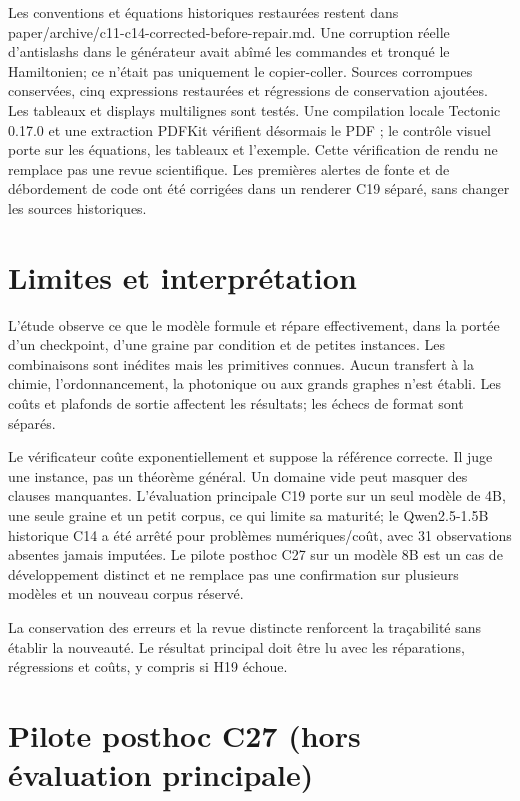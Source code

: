 \documentclass[11pt]{article}
\begin{document}
Les conventions et équations historiques restaurées restent dans paper/archive/c11-c14-corrected-before-repair.md. Une corruption réelle d'antislashs dans le générateur avait abîmé les commandes et tronqué le Hamiltonien; ce n'était pas uniquement le copier-coller. Sources corrompues conservées, cinq expressions restaurées et régressions de conservation ajoutées. Les tableaux et displays multilignes sont testés. Une compilation locale Tectonic 0.17.0 et une extraction PDFKit vérifient désormais le PDF ; le contrôle visuel porte sur les équations, les tableaux et l’exemple. Cette vérification de rendu ne remplace pas une revue scientifique. Les premières alertes de fonte et de débordement de code ont été corrigées dans un renderer C19 séparé, sans changer les sources historiques.

\section{Limites et interprétation}

L'étude observe ce que le modèle formule et répare effectivement, dans la portée d'un checkpoint, d'une graine par condition et de petites instances. Les combinaisons sont inédites mais les primitives connues. Aucun transfert à la chimie, l'ordonnancement, la photonique ou aux grands graphes n'est établi. Les coûts et plafonds de sortie affectent les résultats; les échecs de format sont séparés.

Le vérificateur coûte exponentiellement et suppose la référence correcte. Il juge une instance, pas un théorème général. Un domaine vide peut masquer des clauses manquantes. L'évaluation principale C19 porte sur un seul modèle de 4B, une seule graine et un petit corpus, ce qui limite sa maturité; le Qwen2.5-1.5B historique C14 a été arrêté pour problèmes numériques/coût, avec 31 observations absentes jamais imputées. Le pilote posthoc C27 sur un modèle 8B est un cas de développement distinct et ne remplace pas une confirmation sur plusieurs modèles et un nouveau corpus réservé.

La conservation des erreurs et la revue distincte renforcent la traçabilité sans établir la nouveauté. Le résultat principal doit être lu avec les réparations, régressions et coûts, y compris si H19 échoue.

\section{Pilote posthoc C27 (hors évaluation principale)}
\end{document}
